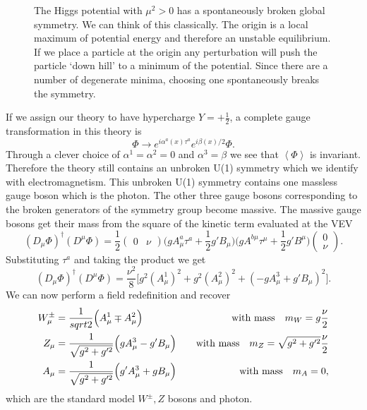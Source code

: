 \begin{figure}[h]
    \begin{center}
    \end{center}
    \caption{The Higgs potential with $\mu^2>0$ has a spontaneously broken global symmetry.  We can think of this classically. The origin is a local maximum of potential energy and therefore an unstable equilibrium. If we place a particle at the origin any perturbation will push the particle `down hill' to a minimum of the potential.  Since there are a number of degenerate minima, choosing one spontaneously breaks the symmetry.}
    \label{fig:higgspot}
\end{figure}


If we assign our theory to have hypercharge $Y=+\frac{1}{2}$, a complete gauge transformation in this theory is
\begin{equation}
  \Phi\rightarrow e^{i\alpha^a(x)\tau^a}e^{i\beta(x)/2}\Phi.
\end{equation}
Through a clever choice of $\alpha^1=\alpha^2=0$ and $\alpha^3=\beta$ we see that $\left<\Phi\right>$ is invariant.
Therefore the theory still contains an unbroken U(1) symmetry which we identify with electromagnetism.
This unbroken U(1) symmetry contains one massless gauge boson which is the photon.
The other three gauge bosons corresponding to the broken generators of the symmetry group become massive.
The massive gauge bosons get their mass from the square of the kinetic term evaluated at the VEV
\begin{equation}
  (D_\mu\Phi)^\dagger(D^\mu\Phi)=\frac{1}{2}(\begin{matrix}0& \nu\end{matrix})\Big(gA^a_\mu\tau^a+\frac{1}{2}g'B_\mu\Big)\Big(gA^{b\mu}\tau^\mu+\frac{1}{2}g'B^\mu\Big)\left(\begin{matrix}0\\\nu\end{matrix}\right).
\end{equation}
Substituting $\tau^a$ and taking the product we get
\begin{equation}
  (D_\mu\Phi)^\dagger(D^\mu\Phi)=\frac{\nu^2}{8}\Big[g^2(A^1_\mu)^2+g^2(A^2_\mu)^2+(-gA^3_\mu+g'B_\mu)^2\Big].
\end{equation}
We can now perform a field redefinition and recover
\begin{align}
  W^\pm_\mu&=\frac{1}{sqrt{2}}\Big(A^1_\mu\mp A^2_\mu\Big)&\mbox{\quad with mass\quad} m_W=g\frac{\nu}{2}\\
  Z_\mu&=\frac{1}{\sqrt{g^2+g'^2}}\Big(gA^3_\mu-g'B_\mu\Big)&\mbox{\quad with mass\quad} m_Z=\sqrt{g^2+g'^2}\frac{\nu}{2}\\
  A_\mu&=\frac{1}{\sqrt{g^2+g'^2}}\Big(g'A^3_\mu+gB_\mu\Big)&\mbox{\quad with mass\quad} m_A=0,
\end{align}
which are the standard model $W^\pm, Z$ bosons and photon.

